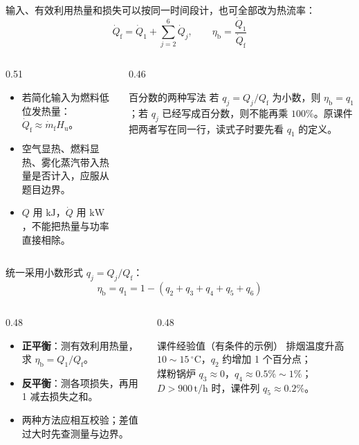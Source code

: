 \begin{frame}[t,shrink]{}
输入、有效利用热量和损失可以按同一时间段计，也可全部改为热流率：
$$
\dot Q_{\mathrm{f}}=\dot Q_1+\sum_{j=2}^{6}\dot Q_j,
\qquad
\eta_{\mathrm{b}}=\frac{\dot Q_1}{\dot Q_{\mathrm{f}}}
$$
\begin{columns}[T,onlytextwidth]
\begin{column}{0.51\textwidth}
  \begin{itemize}
    \item 若简化输入为燃料低位发热量：\(\dot Q_{\mathrm{f}}\approx\dot m_{\mathrm{f}}H_{\mathrm{u}}\)。
    \item 空气显热、燃料显热、雾化蒸汽带入热量是否计入，应服从题目边界。
    \item \(Q\) 用 \(\mathrm{kJ}\)，\(\dot Q\) 用 \(\mathrm{kW}\)，不能把热量与功率直接相除。
  \end{itemize}
\end{column}
\begin{column}{0.46\textwidth}
  \begin{keybox}{百分数的两种写法}
  \small 若 \(q_j=Q_j/Q_{\mathrm{f}}\) 为小数，则 \(\eta_{\mathrm{b}}=q_1\)；若 \(q_j\) 已经写成百分数，则不能再乘 \(100\%\)。原课件把两者写在同一行，读式子时要先看 \(q_1\) 的定义。
  \end{keybox}
\end{column}
\end{columns}
\end{frame}

\begin{frame}[t,shrink]{}
统一采用小数形式 \(q_j=Q_j/Q_{\mathrm{f}}\)：
$$
\eta_{\mathrm{b}}=q_1
=1-\left(q_2+q_3+q_4+q_5+q_6\right)
$$
\begin{columns}[T,onlytextwidth]
\begin{column}{0.48\textwidth}
  \begin{itemize}
    \item \textbf{正平衡}：测有效利用热量，求 \(\eta_{\mathrm{b}}=Q_1/Q_{\mathrm{f}}\)。
    \item \textbf{反平衡}：测各项损失，再用 1 减去损失之和。
    \item 两种方法应相互校验；差值过大时先查测量与边界。
  \end{itemize}
\end{column}
\begin{column}{0.48\textwidth}
  \begin{keybox}{课件经验值（有条件的示例）}
  \small
  排烟温度升高 \(10\sim15\,\mathrm{^\circ C}\)，\(q_2\) 约增加 1 个百分点；\\
  煤粉锅炉 \(q_3\approx0\)，\(q_4\approx0.5\%\sim1\%\)；\\
  \(D>900\,\mathrm{t/h}\) 时，课件列 \(q_5\approx0.2\%\)。
  \end{keybox}
\end{column}
\end{columns}
\end{frame}

